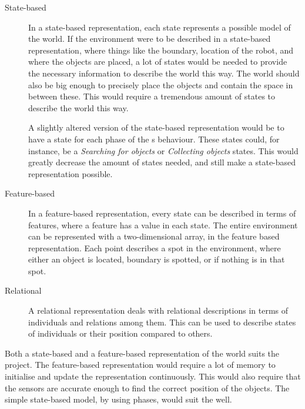 \begin{description}
\item[State-based] In a state-based representation, each state represents a possible model of the world. If the environment were to be described in a state-based representation, where things like the boundary, location of the robot, and where the objects are placed, a lot of states would be needed to provide the necessary information to describe the world this way. The world should also be big enough to precisely place the objects and contain the space in between these. This would require a tremendous amount of states to describe the world this way. 

A slightly altered version of the state-based representation would be to have a state for each phase of the \projname{}s behaviour. These states could, for instance, be a \emph{Searching for objects} or \emph{Collecting objects} states. This would greatly decrease the amount of states needed, and still make a state-based representation possible. 

\item[Feature-based] In a feature-based representation, every state can be described in terms of features, where a feature has a value in each state. The entire environment can be represented with a two-dimensional array, in the feature based representation. Each point describes a spot in the environment, where either an object is located, boundary is spotted, or if nothing is in that spot. 

\item[Relational] A relational representation deals with relational descriptions in terms of individuals and relations among them. This can be used to describe states of individuals or their position compared to others. 
\end{description}

Both a state-based and a feature-based representation of the world suits the project. The feature-based representation would require a lot of memory to initialise and update the representation continuously. This would also require that the sensors are accurate enough to find the correct position of the objects. The simple state-based model, by using phases, would suit the \projname{} well. 






